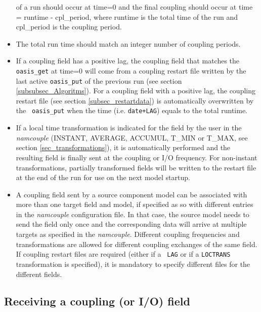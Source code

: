 \begin{itemize}
  of a run should occur at time=0 and the final coupling should occur
  at time = runtime - cpl\_period, where runtime is the total time of
  the run and cpl\_period is the coupling period.
\item The total run time should match an integer number of coupling
  periods.
\item If a coupling field has a positive lag, the coupling field that
  matches the {\tt oasis\_get} at time=0 will come from a coupling
  restart file written by the last active {\tt oasis\_put} of the
  previous run (see section \ref{subsubsec_Algoritms}). For a coupling
  field with a positive lag, the coupling restart file (see section
  \ref{subsec_restartdata}) is automatically overwritten by the {\tt
    oasis\_put} when the time (i.e. {\tt date+LAG}) equals to the
  total runtime.
\item If a local time transformation is indicated for the field by the
  user in the {\it namcouple} (INSTANT, AVERAGE, ACCUMUL, T\_MIN or
  T\_MAX, see section \ref{sec_transformations}), it is automatically
  performed and the resulting field is finally sent at the coupling or
  I/O frequency.  For non-instant transformations, partially
  transformed fields will be written to the restart file at the end of
  the run for use on the next model startup.
\item A coupling field sent by a source component model can be
  associated with more than one target field and model, if specified
  as so with different entries in the {\it namcouple} configuration
  file. In that case, the source model needs to send the field only
  once and the corresponding data will arrive at multiple targets as
  specified in the {\it namcouple}. Different coupling frequencies and
  transformations are allowed for different coupling exchanges of the
  same field. If coupling restart files are required (either if a {\tt
    LAG} or if a {\tt LOCTRANS} transformation is specified), it is
  mandatory to specify different files for the different fields.

\end{itemize}

\subsection{Receiving a coupling (or I/O) field}

